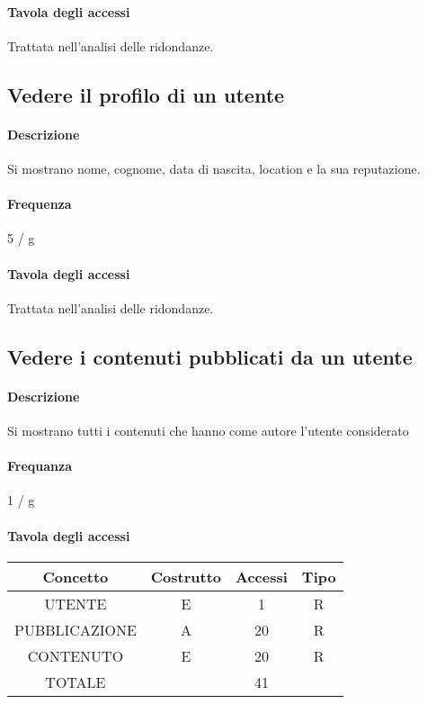 \documentclass[a4paper,12pt]{report}
\begin{document}
\paragraph{Tavola degli accessi}  
Trattata nell'analisi delle ridondanze.
\subsection{Vedere il profilo di un utente} \label{vedere_profilo}
\paragraph{Descrizione} Si mostrano nome, cognome, data di nascita, location e la sua reputazione.
\paragraph{Frequenza} 5 / g
\paragraph{Tavola degli accessi}  
Trattata nell'analisi delle ridondanze.
\subsection{Vedere i contenuti pubblicati da un utente} \label{vedere_post_utente}
\paragraph{Descrizione} Si mostrano tutti i contenuti che hanno come autore l'utente considerato
\paragraph{Frequanza} 1 / g
\begin{table}[H]
\paragraph{Tavola degli accessi\newline}
\begin{tabular}{|c|c|c|c|}
\hline
Concetto      & Costrutto & Accessi & Tipo \\ \hline
UTENTE        & E         & 1       & R    \\ \hline
PUBBLICAZIONE & A         & 20      & R    \\ \hline
CONTENUTO     & E         & 20      & R    \\ \hline
TOTALE        &           & 41      &      \\ \hline
\end{tabular}
\end{table}
\end{document}
